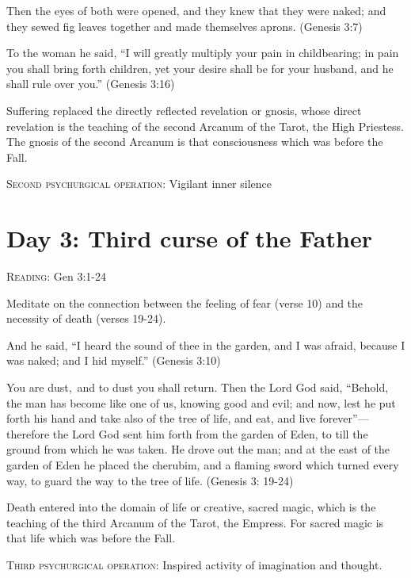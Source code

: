 Then the eyes of both were opened, and they knew that they were naked; and they sewed fig leaves together and made themselves aprons. (Genesis 3:7)

To the woman he said, ``I will greatly multiply your pain in childbearing; in pain you shall bring forth children, yet your desire shall be for your husband, and he shall rule over you.'' (Genesis 3:16)

\begin{quotex}
Suffering replaced the directly reflected revelation or gnosis, whose direct revelation is the teaching of the second Arcanum of the Tarot, the High Priestess. The gnosis of the second Arcanum is that consciousness which was before the Fall. 

\end{quotex}
\textsc{Second psychurgical operation}: Vigilant inner silence

\section{Day 3: Third curse of the Father}

\textsc{Reading}: Gen 3:1-24

Meditate on the connection between the feeling of fear (verse 10) and the necessity of death (verses 19-24).

And he said, ``I heard the sound of thee in the garden, and I was afraid, because I was naked; and I hid myself.'' (Genesis 3:10)

You are dust, and to dust you shall return. Then the Lord God said, ``Behold, the man has become like one of us, knowing good and evil; and now, lest he put forth his hand and take also of the tree of life, and eat, and live forever''— therefore the Lord God sent him forth from the garden of Eden, to till the ground from which he was taken. He drove out the man; and at the east of the garden of Eden he placed the cherubim, and a flaming sword which turned every way, to guard the way to the tree of life. (Genesis 3: 19-24)

\begin{quotex}
Death entered into the domain of life or creative, sacred magic, which is the teaching of the third Arcanum of the Tarot, the Empress. For sacred magic is that life which was before the Fall. 

\end{quotex}
\textsc{Third psychurgical operation}: Inspired activity of imagination and thought.

